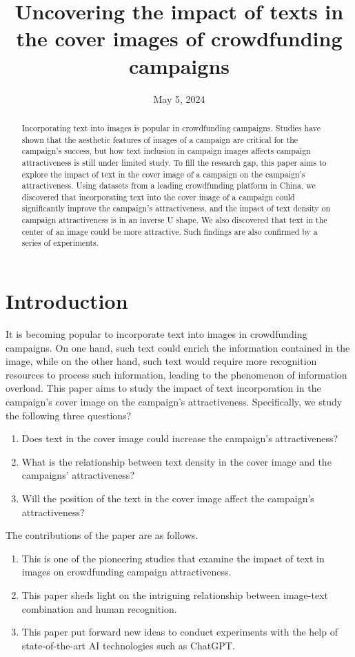 \documentclass[a4paper]{article}
\title{Uncovering the impact of texts in the cover images of crowdfunding campaigns}
\author{}
\date{May 5, 2024}
\begin{document}
\maketitle


\begin{abstract}
    Incorporating text into images is popular in crowdfunding campaigns. Studies have shown that the aesthetic features of images of a campaign are critical for the campaign's success, but how text inclusion in campaign images affects campaign attractiveness is still under limited study. To fill the research gap, this paper aims to explore the impact of text in the cover image of a campaign on the campaign's attractiveness.  Using datasets from a leading crowdfunding platform in China, we discovered that incorporating text into the cover image of a campaign could significantly improve the campaign's attractiveness, and the impact of text density on campaign attractiveness is in an inverse U shape. We also discovered that text in the center of an image could be more attractive. Such findings are also confirmed by a series of experiments. 
\end{abstract}

\tableofcontents

\section{Introduction}
It is becoming popular to incorporate text into images in crowdfunding campaigns. On one hand, such text could enrich the information contained in the image, while on the other hand, such text would require more recognition resources to process such information, leading to the phenomenon of information overload. This paper aims to study the impact of text incorporation in the campaign's cover image on the campaign's attractiveness. Specifically, we study the following three questions?
\begin{enumerate}
    \item Does text in the cover image could increase the campaign's attractiveness?
    \item What is the relationship between text density in the cover image and the campaigns' attractiveness?
    \item Will the position of the text in the cover image affect the campaign's attractiveness?
\end{enumerate}

The contributions of the paper are as follows.
\begin{enumerate}
    \item This is one of the pioneering studies that examine the impact of text in images on crowdfunding campaign attractiveness. 
    \item This paper sheds light on the intriguing relationship between image-text combination and human recognition.
    \item This paper put forward new ideas to conduct experiments with the help of state-of-the-art AI technologies such as ChatGPT. 
      
\end{enumerate}
\end{document}
